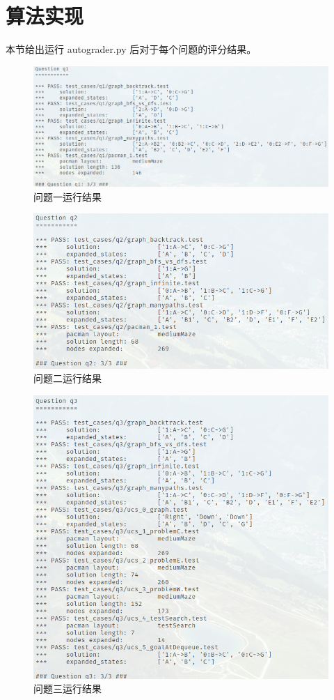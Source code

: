 \documentclass[12pt,onecolumn]{report}
\theoremstyle{plain}
\numberwithin{figure}{section}
\begin{document}
\section{算法实现}
本节给出运行 autograder.py 后对于每个问题的评分结果。
\begin{figure}[H]
  \centering
  \includegraphics[width=\linewidth]{figures/q1.png}
  \caption{问题一运行结果}
\end{figure}

\begin{figure}[H]
  \centering
  \includegraphics{figures/q2.png}
  \caption{问题二运行结果}
\end{figure}

\begin{figure}[H]
  \centering
  \includegraphics{figures/q3.png}
  \caption{问题三运行结果}
\end{figure}
\end{document}
